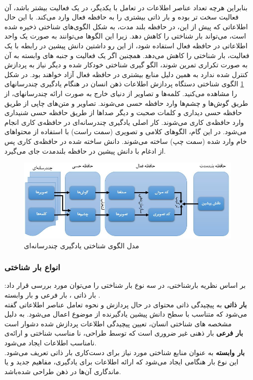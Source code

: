 \\
بنابراین هرچه تعداد عناصر اطلاعات در تعامل با یکدیگر، در یک فعالیت بیشتر باشد، آن فعالیت سخت تر بوده و بار ذاتی بیشتری را به حافظه فعال وارد می‌کند. با این حال اطلاعاتی که پیش از این، در حافظه بلند مدت، به شکل الگوی‌های شناختی
ذخیره شده است، می‌تواند بار شناختی را کاهش دهد. زیرا این الگو‌ها می‌توانند به صورت یک واحد اطلاعاتی در حافظه فعال استفاده شود، از این رو داشتین دانش پیشین در رابطه با یک فعالیت،‌ بار شناختی را کاهش می‌دهد. همچنین اگر یک فعالیت و جنبه های وابسته به آن به صورت تکراری تمرین شوند، الگو گیری شناختی خودکار شده و دیگر نیاز به پردازش کنترل شده ندارد به همین دلیل منابع بیشتری در حافظه فعال آزاد خواهند بود.
\cite{antonenko2010using}
در شکل 
\ref{fig:cognitionpatern}
الگوی شناختی دستگاه پردازش اطلاعات ذهن انسان 
در  هنگام  یادگيری  چندرسانهای  را  مشاهده می‌کنید. كلمه‌ها و  تصاویر  از  دنيای  خارج  به  صورت  ارائه 
چندرسانهای، از طریق گوش‌ها و چشم‌ها وارد حافظه حسی می‌شوند. تصاویر و متن‌های چاپی از طریق 
حافظه حسی دیداری و كلمات صحبت و دیگر صداها از طریق حافظه حسی شنيداری وارد حافظه‌ی كاری
می‌شوند. كار اصلی یادگيری چندرسانه‌ای در حافظه‌ی كاری انجام می‌شود. در این گام، الگوهای كلامی 
و تصویری (سمت راست) با استفاده از محتواهای خام وارد شده (سمت چپ) ساخته می‌شوند. دانش 
ساخته شده در حافظه‌ی كاری پس از ادغام با دانش پيشين در حافظه بلندمدت جای می‌گيرد.
\begin{figure}[htbp]
	\centering
	\includegraphics[width=\linewidth]{figures/cognition_patern}
	\caption[مدل الگوی شناختی یادگیری]{مدل الگوی شناختی یادگیری چند‌رسانه‌ای}
	\label{fig:cognitionpatern}
\end{figure}


\subsubsection{انواع بار شناختی}
بر اساس نظریه بارشناختی، در سه نوع بار شناختی را می‌توان مورد بررسی قرار داد: بار ذاتی
، بار فرعی
و بار وابسته
.
\\
\textbf{بار ذاتی}
به پیچیدگی ذاتی محتوای در حال پردازش و نحوه تعامل عناصر اطلاعاتی گفته می‌شود که متناسب با سطح دانش پیشین یادگیرنده از موضوع اعمال می‌شود. به دلیل مشخصه های شناختی انسان، تعیین پیچیدگی اطلاعات پردازش شده دشوار است
\\
\textbf{بار فرعی}
بار ذهنی غیر ضروری است که توسط طراحی،‌ نا مناسب شناختی و ارائه‌ی نامناسب اطلاعات ایجاد می‌شود.
\\
\textbf{بار وابسته}
به عنوان منابع شناختی مورد نیاز برای دست‌کاری بار ذاتی تعریف می‌شود. این نوع بار هنگامی ایجاد می‌شود که ارائه اطلاعات برای یادگیری،‌ مفاهیم جدید و یا ماندگاری آن‌ها در ذهن طراحی شده‌باشد.
\cite{antonenko2010using}
